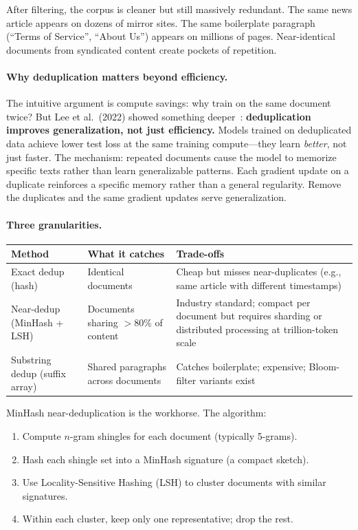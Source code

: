 After filtering, the corpus is cleaner but still massively redundant. The same news article appears on dozens of mirror sites. The same boilerplate paragraph (``Terms of Service'', ``About Us'') appears on millions of pages. Near-identical documents from syndicated content create pockets of repetition.

\paragraph{Why deduplication matters beyond efficiency.} The intuitive argument is compute savings: why train on the same document twice? But Lee et al.\ (2022) showed something deeper~\cite{lee2022dedup}: \textbf{deduplication improves generalization, not just efficiency.} Models trained on deduplicated data achieve lower test loss at the same training compute---they learn \emph{better}, not just faster. The mechanism: repeated documents cause the model to memorize specific texts rather than learn generalizable patterns. Each gradient update on a duplicate reinforces a specific memory rather than a general regularity. Remove the duplicates and the same gradient updates serve generalization.

\paragraph{Three granularities.}

\begin{center}
\begin{tabularx}{\textwidth}{@{}lp{3.5cm}X@{}}
\toprule
\textbf{Method} & \textbf{What it catches} & \textbf{Trade-offs} \\
\midrule
Exact dedup (hash) & Identical documents & Cheap but misses near-duplicates (e.g., same article with different timestamps) \\
Near-dedup (MinHash + LSH) & Documents sharing $>$80\% of content & Industry standard; compact per document but requires sharding or distributed processing at trillion-token scale \\
Substring dedup (suffix array) & Shared paragraphs across documents & Catches boilerplate; expensive; Bloom-filter variants exist \\
\bottomrule
\end{tabularx}
\end{center}

MinHash near-deduplication is the workhorse. The algorithm:
\begin{enumerate}[nosep]
  \item Compute $n$-gram shingles for each document (typically 5-grams).
  \item Hash each shingle set into a MinHash signature (a compact sketch).
  \item Use Locality-Sensitive Hashing (LSH) to cluster documents with similar signatures.
  \item Within each cluster, keep only one representative; drop the rest.
\end{enumerate}

